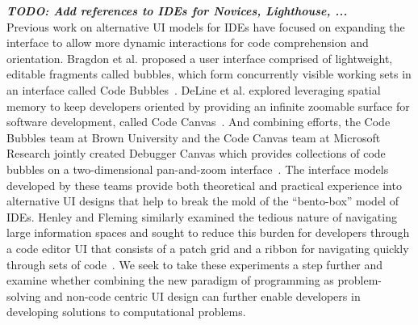 \documentclass{ppig}
\newcommand{\bold}[1]{\textit{\textbf{\color{aoblue}#1}}}
\begin{document}
\bold{TODO: Add references to IDEs for Novices, Lighthouse, ...\\}
Previous work on alternative UI models for IDEs have focused on expanding the interface to allow more dynamic interactions for code comprehension and orientation.
Bragdon et al. proposed a user interface comprised of lightweight, editable fragments called bubbles, which form concurrently visible working sets in an interface called Code Bubbles~\cite{bragdon2010bubbles}.
DeLine et al. explored leveraging spatial memory to keep developers oriented by providing an infinite zoomable surface for software development, called Code Canvas~\cite{deline2010canvas}.
And combining efforts, the Code Bubbles team at Brown University and the Code Canvas team at Microsoft Research jointly created Debugger Canvas which provides collections of code bubbles on a two-dimensional pan-and-zoom interface~\cite{deline2012debugger}.
The interface models developed by these teams provide both theoretical and practical experience into alternative UI designs that help to break the mold of the ``bento-box'' model of IDEs.
Henley and Fleming similarly examined the tedious nature of navigating large information spaces and sought to reduce this burden for developers through a code editor UI that consists of a patch grid and a ribbon for navigating quickly through sets of code~\cite{henley2014patchworks}.
We seek to take these experiments a step further and examine whether combining the new paradigm of programming as problem-solving and non-code centric UI design can further enable developers in developing solutions to computational problems.
\end{document}

